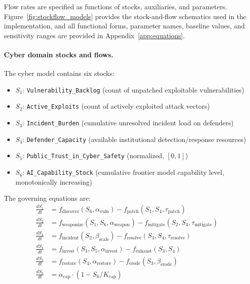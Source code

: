 \documentclass[11pt]{article}
\begin{document}
Flow rates are specified as functions of stocks, auxiliaries, and parameters. Figure~\ref{fig:stockflow_models} provides the stock-and-flow schematics used in the implementation, and all functional forms, parameter names, baseline values, and sensitivity ranges are provided in Appendix~\ref{app:equations}.

\paragraph{Cyber domain stocks and flows.} The cyber model contains six stocks:

\begin{itemize}[leftmargin=2em,itemsep=1pt]
\item $S_1$: \texttt{Vulnerability\_Backlog} (count of unpatched exploitable vulnerabilities)
\item $S_2$: \texttt{Active\_Exploits} (count of actively exploited attack vectors)
\item $S_3$: \texttt{Incident\_Burden} (cumulative unresolved incident load on defenders)
\item $S_4$: \texttt{Defender\_Capacity} (available institutional detection/response resources)
\item $S_5$: \texttt{Public\_Trust\_in\_Cyber\_Safety} (normalized, $[0,1]$)
\item $S_6$: \texttt{AI\_Capability\_Stock} (cumulative frontier model capability level, monotonically increasing)
\end{itemize}

\noindent The governing equations are:
\begin{align}
\frac{dS_1}{dt} &= f_{\text{discover}}(S_6, \alpha_{\text{vuln}}) - f_{\text{patch}}(S_1, S_4, \tau_{\text{patch}}) \label{eq:cyber1}\\
\frac{dS_2}{dt} &= f_{\text{weaponize}}(S_1, S_6, \alpha_{\text{weapon}}) - f_{\text{mitigate}}(S_2, S_4, \tau_{\text{mitigate}}) \label{eq:cyber2}\\
\frac{dS_3}{dt} &= f_{\text{incident}}(S_2, \beta_{\text{scale}}) - f_{\text{resolve}}(S_3, S_4, \tau_{\text{resolve}}) \label{eq:cyber3}\\
\frac{dS_4}{dt} &= f_{\text{invest}}(S_3, S_5, \alpha_{\text{invest}}) - f_{\text{exhaust}}(S_3, S_4) \label{eq:cyber4}\\
\frac{dS_5}{dt} &= f_{\text{restore}}(S_4, \alpha_{\text{restore}}) - f_{\text{erode}}(S_3, \beta_{\text{erode}}) \label{eq:cyber5}\\
\frac{dS_6}{dt} &= \alpha_{\text{cap}} \cdot (1 - S_6/K_{\text{cap}}) \label{eq:cyber6}
\end{align}
\end{document}
